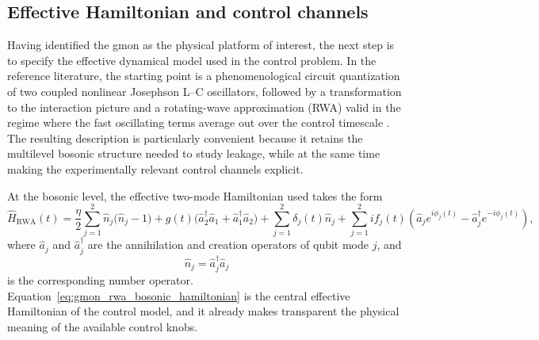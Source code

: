 \subsection{Effective Hamiltonian and control channels}
\label{subsec:gmon_effective_hamiltonian}

Having identified the gmon as the physical platform of interest, the next step is to specify the effective dynamical model used in the control problem. In the reference literature, the starting point is a phenomenological circuit quantization of two coupled nonlinear Josephson L--C oscillators, followed by a transformation to the interaction picture and a rotating-wave approximation (RWA) valid in the regime where the fast oscillating terms average out over the control timescale \cite{Niu2019}. The resulting description is particularly convenient because it retains the multilevel bosonic structure needed to study leakage, while at the same time making the experimentally relevant control channels explicit.

At the bosonic level, the effective two-mode Hamiltonian used takes the form
\begin{equation}
\hat{H}_{\mathrm{RWA}}(t)
=
\frac{\eta}{2}
\sum_{j=1}^{2}
\hat{n}_{j}\bigl(\hat{n}_{j}-1\bigr)
+
g(t)\bigl(\hat{a}_{2}^{\dagger}\hat{a}_{1}+\hat{a}_{1}^{\dagger}\hat{a}_{2}\bigr)
+
\sum_{j=1}^{2}\delta_{j}(t)\hat{n}_{j}
+
\sum_{j=1}^{2}
i f_{j}(t)
\left(
\hat{a}_{j}e^{i\phi_{j}(t)}
-
\hat{a}_{j}^{\dagger}e^{-i\phi_{j}(t)}
\right),
\label{eq:gmon_rwa_bosonic_hamiltonian}
\end{equation}
where $\hat{a}_{j}$ and $\hat{a}_{j}^{\dagger}$ are the annihilation and creation operators of qubit mode $j$, and
\begin{equation}
\hat{n}_{j}=\hat{a}_{j}^{\dagger}\hat{a}_{j}
\label{eq:gmon_number_operator}
\end{equation}
is the corresponding number operator. Equation~\eqref{eq:gmon_rwa_bosonic_hamiltonian} is the central effective Hamiltonian of the control model, and it already makes transparent the physical meaning of the available control knobs.

